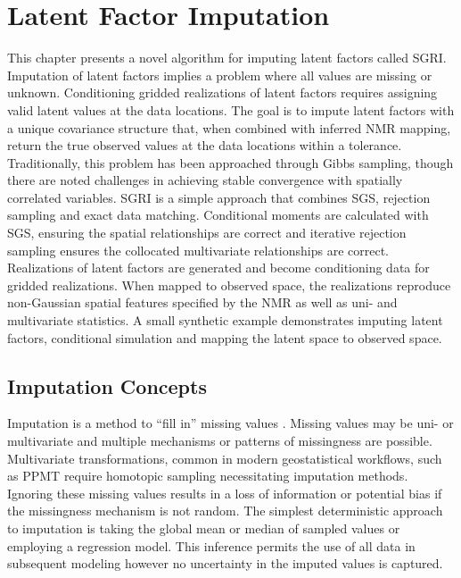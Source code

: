 
\chapter{Latent Factor Imputation}
\label{ch:impute}

This chapter presents a novel algorithm for imputing latent factors called \gls{SGRI}. Imputation of latent factors implies a problem where all values are missing or unknown. Conditioning gridded realizations of latent factors requires assigning valid latent values at the data locations. The goal is to impute latent factors with a unique covariance structure that, when combined with inferred \gls{NMR} mapping, return the true observed values at the data locations within a tolerance. Traditionally, this problem has been approached through Gibbs sampling, though there are noted challenges in achieving stable convergence with spatially correlated variables. \gls{SGRI} is a simple approach that combines \gls{SGS}, rejection sampling and exact data matching. Conditional moments are calculated with \gls{SGS}, ensuring the spatial relationships are correct and iterative rejection sampling ensures the collocated multivariate relationships are correct. Realizations of latent factors are generated and become conditioning data for gridded realizations. When mapped to observed space, the realizations reproduce non-Gaussian spatial features specified by the \gls{NMR} as well as uni- and multivariate statistics. A small synthetic example demonstrates imputing latent factors, conditional simulation and mapping the latent space to observed space.

\FloatBarrier
\section{Imputation Concepts}
\label{sec:impute}

Imputation is a method to ``fill in'' missing values \citep{little2019statistical}. Missing values may be uni- or multivariate and multiple mechanisms or patterns of missingness are possible. Multivariate transformations, common in modern geostatistical workflows, such as \gls{PPMT} \citep{barnett2014projection} require homotopic sampling necessitating imputation methods. Ignoring these missing values results in a loss of information or potential bias if the missingness mechanism is not random. The simplest deterministic approach to imputation is taking the global mean or median of sampled values or employing a regression model. This inference permits the use of all data in subsequent modeling however no uncertainty in the imputed values is captured.

